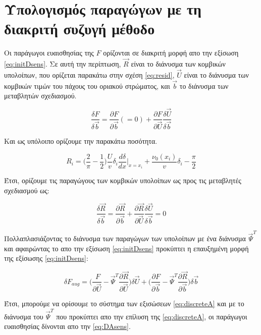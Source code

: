 \section{Υπολογισμός παραγώγων με τη διακριτή συζυγή μέθοδο}

Οι παράγωγοι ευαισθησίας της $F$ ορίζονται σε διακριτή μορφή απο την εξίσωση \ref{eq:initDsens}. Σε αυτή την περίπτωση, $\vec{R}$ είναι το διάνυσμα των κομβικών υπολοίπων, που ορίζεται παρακάτω στην σχέση \ref{eq:resid}, $\vec{U}$ είναι το διάνυσμα των κομβικών τιμών του πάχους του οριακού στρώματος, και $\vec{b}$ το διάνυσμα των μεταβλητών σχεδιασμού. 


\begin{equation}
    \dfrac{\delta F}{\delta \vec{b}} = \dfrac{\partial F}{\partial \vec{b}} (=0) + \dfrac{\partial F}{\partial \vec{U}}\dfrac{\delta \vec{U}}{\delta \vec{b}}
\label{eq:initDsens}
\end{equation}

Και ως υπόλοιπο ορίζουμε την παρακάτω ποσότητα. 


\begin{equation}
 R_i = \Big(\dfrac{2}{\pi} - \dfrac{1}{2} \Big)\dfrac{U}{v}\delta_i\dfrac{d\delta}{dx}\Big |_{x=x_i} + \dfrac{\nu_0(x_i)}{v}\delta_i - \dfrac{\pi}{2}
\label{eq:resid}
\end{equation}

Έτσι, ορίζουμε τις παραγώγους των κομβικών υπολοίπων ως προς τις μεταβλητές σχεδιασμού ως:


\begin{equation}
    \dfrac{\delta \vec{R}}{\delta \vec{b}} = \dfrac{\partial \vec{R}}{\partial \vec{b}} + \dfrac{\partial \vec{R}}{\partial \vec{U}}\dfrac{\delta \vec{U}}{\delta \vec{b}} = 0
\label{eq:residDers}
\end{equation}

Πολλαπλασιάζοντας το διάνυσμα των παραγώγων των υπολοίπων με ένα διάνυσμα $\vec{\Psi}^T$ και αφαιρώντας το απο την εξίσωση \ref{eq:initDsens} προκύπτει η επαυξημένη μορφή της εξίσωσης \ref{eq:initDsens}:

\begin{equation}
\delta F_{aug} = \Big(\dfrac{\ F}{\partial \vec{U}}- \vec{\Psi}^T\dfrac{\partial \vec{R}}{\partial \vec{U}}\Big)\delta \vec{U} + \Big(\dfrac{\partial F}{\partial\vec{b}} - \vec{\Psi}^T\dfrac{\partial\vec{R}}{\partial\vec{b}}\Big)\delta\vec{b}
\label{eq:daAug}
\end{equation}

Έτσι, μπορούμε να ορίσουμε το σύστημα των εξισώσεων \ref{eq:discreteA} και με το διάνυσμα του $\vec{\Psi}^T$ που προκύπτει απο την επίλυση της \ref{eq:discreteA}, οι παράγωγοι ευαισθησίας δίνονται απο την \ref{eq:DAsens}.

